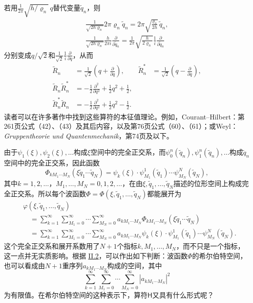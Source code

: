 \documentclass[fontsize=13pt,twoside,openany,headings=normal,parskip=false,bookmarkpackage=false,DIV=calc]{scrbook}
\begin{document}
若用$\frac1{2\pi}\sqrt{h/\varrho_n}\,q$替代变量$\widetilde q_n$，则
\begin{gather*}
 \frac1{\sqrt{2h\varrho_n}}2\pi\varrho_n\widetilde q_n
 =2\pi\sqrt{\frac{\varrho_n}{2h}}\,\widetilde q_n,\\
 \frac1{\sqrt{2h\varrho_n}}\frac h{2\pi i}\frac\partial{\partial\widetilde q_n}
 =\frac1{2\pi}\sqrt{\frac h{2\varrho_n}}\frac1i\frac\partial{\partial\widetilde q_n}
\end{gather*}
分别变成$q/\sqrt2$和$\frac1{\sqrt2}\frac1i\frac\partial{\partial q}$，从而
\begin{align*}
 \widetilde R_n&=\frac1{\sqrt2}\left(q+\frac\partial{\partial q}\right),&
 \widetilde R_n^*&=\frac1{\sqrt2}\left(q-\frac\partial{\partial q}\right),\\
 \widetilde R_n\widetilde R_n^*&=-\frac12\frac{\partial^2}{\partial q^2}+\frac12q^2+\frac12,\\
 \widetilde R_n^*\widetilde R_n&=-\frac12\frac{\partial^2}{\partial q^2}+\frac12q^2-\frac12.
\end{align*}
读者可以在许多著作中找到这些算符的本征值理论。例如，Courant–Hilbert：第261页公式（42）、（43）及其后内容，以及第76页公式（60）、（61）；或Weyl：\emph{Gruppentheorie und Quantenmechanik}，第74页及以下。

由于$\psi_1(\xi),\allowbreak \psi_2(\xi),\allowbreak \ldots$构成$\xi$空间中的完全正交系，而$\psi_0^n(\widetilde q_n),\allowbreak \psi_1^n(\widetilde q_n),\allowbreak \ldots$构成$\widetilde q_n$空间中的完全正交系，因此函数
\[
 \Phi_{kM_1\cdots M_N}(\xi\widetilde q_1\cdots\widetilde q_N)
 =\psi_k(\xi)\cdot\psi_{M_1}^1(\widetilde q_1)\cdots\psi_{M_N}^N(\widetilde q_N),
\]
其中$k=1,\allowbreak 2,\allowbreak \ldots$，$M_1,\allowbreak \ldots,\allowbreak M_N=0,\allowbreak 1,\allowbreak 2,\allowbreak \ldots$，在由$\xi,\allowbreak \widetilde q_1,\allowbreak \ldots,\allowbreak \widetilde q_N$描述的位形空间上构成完全正交系。所以每个波函数$\Phi=\Phi(\xi,\allowbreak \widetilde q_1,\allowbreak \ldots,\allowbreak \widetilde q_N)$都能展开为
\begin{align*}
 &\varphi(\xi,\widetilde q_1,\ldots,\widetilde q_N)\\
 &\quad=\sum_{k=1}^{\infty}\sum_{M_1=0}^{\infty}\cdots\sum_{M_N=0}^{\infty}
 a_{kM_1\cdots M_N}\Phi_{kM_1\cdots M_N}(\xi\widetilde q_1\cdots\widetilde q_N)\\
 &\quad=\sum_{k=1}^{\infty}\sum_{M_1=0}^{\infty}\cdots\sum_{M_N=0}^{\infty}
 a_{kM_1\cdots M_N}\psi_k(\xi)\cdot\psi_{M_1}^1(\widetilde q_1)\cdots\psi_{M_N}^N(\widetilde q_N).
\end{align*}
这个完全正交系和展开系数用了$N+1$个指标$k,\allowbreak M_1,\allowbreak \ldots,\allowbreak M_N$，而不只是一个指标，这一点并无实质影响。根据 \hyperref[sec:II.2]{II.2}，可以作出如下判断：波函数$\Phi$的希尔伯特空间，也可以看成由$N+1$重序列$a_{kM_1\cdots M_N}$构成的空间，其中
\[
 \sum_{k=1}^{\infty}\sum_{M_1=0}^{\infty}\cdots\sum_{M_N=0}^{\infty}|a_{kM_1\cdots M_N}|^2
\]
为有限值。在希尔伯特空间的这种表示下，算符$\mathsf{H}$又具有什么形式呢？
\end{document}
